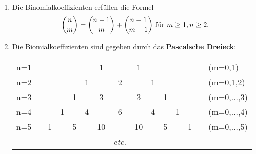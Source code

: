 	\begin{enumerate}
	\item Die Binomialkoeffizienten erfüllen die Formel
	\begin{align*}
	{n \choose m}={n-1 \choose m}+{n-1 \choose m-1} \textnormal{ für } m\geq 1, n\geq 2.
	\end{align*}
	
	\item Die Biomialkoeffizienten sind gegeben durch das \textbf{Pascalsche Dreieck}:\\
		
		\begin{tabular}{lcccccccccccccl}
		n=1 &  &   &   &   &   & 1  &   & 1  &   &   &   &   &  & (m=0,1)     \\
		n=2 &  &   &   &   & 1 &    & 2 &    & 1 &   &   &   &  & (m=0,1,2)   \\
		n=3 &  &   &   & 1 &   & 3  &   & 3  &   & 1 &   &   &  & (m=0,...,3) \\
		n=4 &  &   & 1 &   & 4 &    & 6 &    & 4 &   & 1 &   &  & (m=0,...,4) \\
		n=5 &  & 1 &   & 5 &   & 10 &   & 10 &   & 5 &   & 1 &  & (m=0,...,5) \\
			&  &   &   &   &   &	&\textit{etc.}&	 &	 &	 &	 &	 &	&
		\end{tabular}
		
	\end{enumerate}

